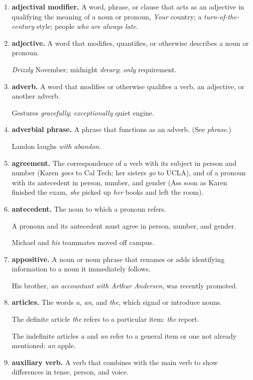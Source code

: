 \documentclass{book}
\numberwithin{equation}{section}
\begin{document}
\begin{enumerate}
    \item \textbf{adjectival modifier.} A word, phrase, or clause that acts as an adjective in qualifying the meaning of a noun or pronoun, \textit{Your} country; a \textit{turn-of-the-century} style; people \textit{who are always late}.
    \item \textbf{adjective.} A word that modifies, quantifies, or otherwise describes a noun or pronoun.
    
    \textit{Drizzly} November; midnight \textit{dreary}; \textit{only} requirement.
    \item \textbf{adverb.} A word that modifies or otherwise qualifies a verb, an adjective, or another adverb.
    
    Gestures \textit{gracefully}; \textit{exceptionally} quiet engine.
    \item \textbf{adverbial phrase.} A phrase that functions as an adverb. (See \textit{phrase}.)
    
    Landon laughs \textit{with abandon}.
    \item \textbf{agreement.} The correspondence of a verb with its subject in person and number (Karen \textit{goes} to Cal Tech; her sisters \textit{go} to UCLA), and of a pronoun with its antecedent in person, number, and gender (Ass soon as Karen finished the exam, \textit{she} picked up \textit{her} books and left the room).
    \item \textbf{antecedent.} The noun to which a pronoun refers.
    
    A pronoun and its antecedent must agree in person, number, and gender.
    
    Michael and \textit{his} teammates moved off campus.
    \item \textbf{appositive.} A noun or noun phrase that renames or adds identifying information to a noun it immediately follows.
    
    His brother, \textit{an accountant with Arthur Andersen}, was recently promoted.
    \item \textbf{articles.} The words \textit{a, an}, and \textit{the}, which signal or introduce nouns.
    
    The definite article \textit{the} refers to a particular item: \textit{the} report.
    
    The indefinite articles \textit{a} and \textit{an} refer to a general item or one not already mentioned: \textit{an} apple.
    \item \textbf{auxiliary verb.} A verb that combines with the main verb to show differences in tense, person, and voice.
    

\end{enumerate}
\end{document}
